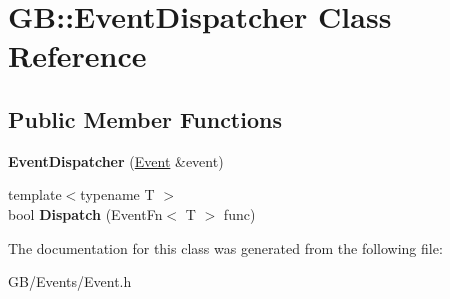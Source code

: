 \hypertarget{class_g_b_1_1_event_dispatcher}{}\section{GB\+::Event\+Dispatcher Class Reference}
\label{class_g_b_1_1_event_dispatcher}
\subsection*{Public Member Functions}
\begin{DoxyCompactItemize}
\item 
\mbox{\label{class_g_b_1_1_event_dispatcher_a204d3f5a120c0570ea38c3d79b17b898}} 
{\bfseries Event\+Dispatcher} (\mbox{\hyperlink{class_g_b_1_1_event}{Event}} \&event)
\item 
\mbox{\label{class_g_b_1_1_event_dispatcher_a56ab5d7a149cfcb755951dfd853111fd}} 
{\footnotesize template$<$typename T $>$ }\\bool {\bfseries Dispatch} (Event\+Fn$<$ T $>$ func)
\end{DoxyCompactItemize}


The documentation for this class was generated from the following file\+:\begin{DoxyCompactItemize}
\item 
G\+B/\+Events/Event.\+h\end{DoxyCompactItemize}
